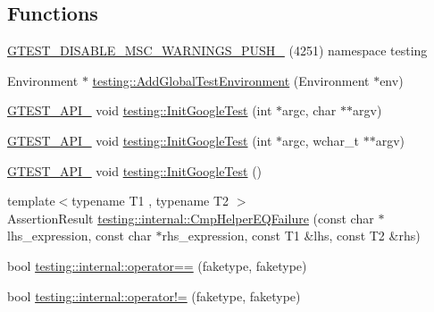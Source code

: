 \subsection*{Functions}
\begin{DoxyCompactItemize}
\item 
\mbox{\hyperlink{googletest-master_2googletest_2include_2gtest_2gtest_8h_a88f79832f9d045112a76e9da8611cc13}{G\+T\+E\+S\+T\+\_\+\+D\+I\+S\+A\+B\+L\+E\+\_\+\+M\+S\+C\+\_\+\+W\+A\+R\+N\+I\+N\+G\+S\+\_\+\+P\+U\+S\+H\+\_\+}} (4251) namespace testing
\item 
Environment $\ast$ \mbox{\hyperlink{namespacetesting_a224caeebdb6586b728d204367fea1087}{testing\+::\+Add\+Global\+Test\+Environment}} (Environment $\ast$env)
\item 
\mbox{\hyperlink{_obj__test_2lib_2googletest-release-1_88_81_2googletest_2include_2gtest_2internal_2gtest-port_8h_aa73be6f0ba4a7456180a94904ce17790}{G\+T\+E\+S\+T\+\_\+\+A\+P\+I\+\_\+}} void \mbox{\hyperlink{namespacetesting_afd726ae08c9bd16dc52f78c822d9946b}{testing\+::\+Init\+Google\+Test}} (int $\ast$argc, char $\ast$$\ast$argv)
\item 
\mbox{\hyperlink{_obj__test_2lib_2googletest-release-1_88_81_2googletest_2include_2gtest_2internal_2gtest-port_8h_aa73be6f0ba4a7456180a94904ce17790}{G\+T\+E\+S\+T\+\_\+\+A\+P\+I\+\_\+}} void \mbox{\hyperlink{namespacetesting_ae5a88709a4a7529e30c83242156556b3}{testing\+::\+Init\+Google\+Test}} (int $\ast$argc, wchar\+\_\+t $\ast$$\ast$argv)
\item 
\mbox{\hyperlink{_obj__test_2lib_2googletest-release-1_88_81_2googletest_2include_2gtest_2internal_2gtest-port_8h_aa73be6f0ba4a7456180a94904ce17790}{G\+T\+E\+S\+T\+\_\+\+A\+P\+I\+\_\+}} void \mbox{\hyperlink{namespacetesting_ace27eb9a2534996f3711aa719689f987}{testing\+::\+Init\+Google\+Test}} ()
\item 
{\footnotesize template$<$typename T1 , typename T2 $>$ }\\Assertion\+Result \mbox{\hyperlink{namespacetesting_1_1internal_a1def8ec9393360a1b34a20528703e7f7}{testing\+::internal\+::\+Cmp\+Helper\+E\+Q\+Failure}} (const char $\ast$lhs\+\_\+expression, const char $\ast$rhs\+\_\+expression, const T1 \&lhs, const T2 \&rhs)
\item 
bool \mbox{\hyperlink{namespacetesting_1_1internal_a5e3e473798de3189e9343132bcfd4fea}{testing\+::internal\+::operator==}} (faketype, faketype)
\item 
bool \mbox{\hyperlink{namespacetesting_1_1internal_afa44fdec84edfc155ef63e4f0d4287cc}{testing\+::internal\+::operator!=}} (faketype, faketype)

\end{DoxyCompactItemize}
